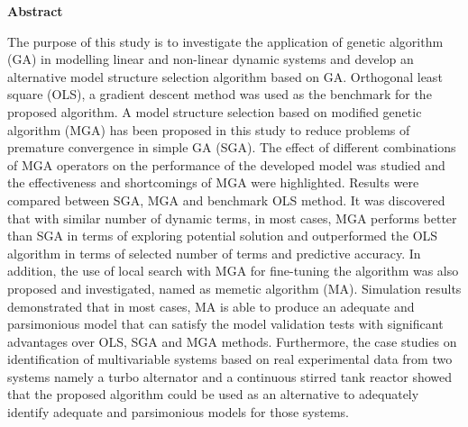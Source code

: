 \newpage
{}
\begin{center}
    \large \textbf{Abstract}
\end{center}
\vskip 0.45in


The purpose of this study is to investigate the application of genetic
algorithm (GA) in modelling linear and non-linear dynamic systems and develop an
alternative model structure selection algorithm based on GA. Orthogonal least square
(OLS), a gradient descent method was used as the benchmark for the proposed
algorithm. A model structure selection based on modified genetic algorithm (MGA)
has been proposed in this study to reduce problems of premature convergence in
simple GA (SGA). The effect of different combinations of MGA operators on the
performance of the developed model was studied and the effectiveness and shortcomings
of MGA were highlighted. Results were compared between SGA, MGA and benchmark
OLS method. It was discovered that with similar number of dynamic terms, in most
cases, MGA performs better than SGA in terms of exploring potential solution and
outperformed the OLS algorithm in terms of selected number of terms and predictive
accuracy. In addition, the use of local search with MGA for fine-tuning the algorithm
was also proposed and investigated, named as memetic algorithm (MA). Simulation
results demonstrated that in most cases, MA is able to produce an adequate and
parsimonious model that can satisfy the model validation tests with significant
advantages over OLS, SGA and MGA methods. Furthermore, the case studies on
identification of multivariable systems based on real experimental data from two systems
namely a turbo alternator and a continuous stirred tank reactor showed that the proposed
algorithm could be used as an alternative to adequately identify adequate and
parsimonious models for those systems.
\newpage
{}
